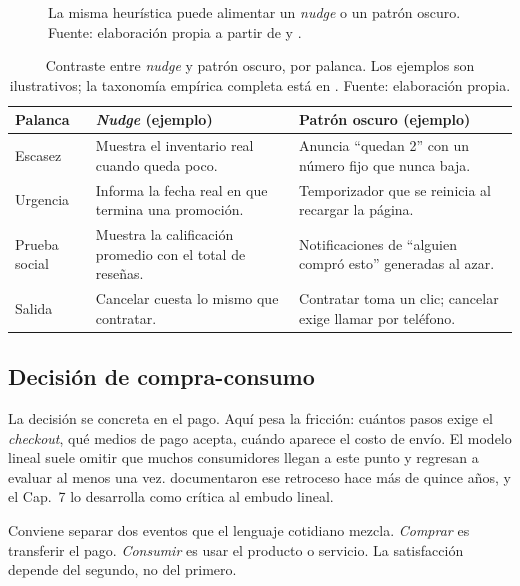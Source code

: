 \begin{figure}[!htb]
  \centering
  \resizebox{0.85\textwidth}{!}{}
  \caption{La misma heurística puede alimentar un \textit{nudge} o un patrón
  oscuro. Fuente: elaboración propia a partir de \textcite{thalersunstein2008}
  y \textcite{mathur2019}.}
  \label{fig:cap06-nudge}
\end{figure}

\begin{table}[!htb]
\centering
\begin{tabular}{@{}p{2.6cm}p{4.9cm}p{5.0cm}@{}}
\toprule
Palanca & \textit{Nudge} (ejemplo) & Patrón oscuro (ejemplo) \\
\midrule
Escasez & Muestra el inventario real cuando queda poco. & Anuncia \enquote{quedan 2} con un número fijo que nunca baja. \\
Urgencia & Informa la fecha real en que termina una promoción. & Temporizador que se reinicia al recargar la página. \\
Prueba social & Muestra la calificación promedio con el total de reseñas. & Notificaciones de \enquote{alguien compró esto} generadas al azar. \\
Salida & Cancelar cuesta lo mismo que contratar. & Contratar toma un clic; cancelar exige llamar por teléfono. \\
\bottomrule
\end{tabular}
\caption{Contraste entre \textit{nudge} y patrón oscuro, por palanca. Los
ejemplos son ilustrativos; la taxonomía empírica completa está en
\textcite{mathur2019}. Fuente: elaboración propia.}
\label{tab:cap06-nudge}
\end{table}

\subsection{Decisión de compra-consumo}

La decisión se concreta en el pago. Aquí pesa la fricción: cuántos pasos exige
el \textit{checkout}, qué medios de pago acepta, cuándo aparece el costo de
envío. El modelo lineal suele omitir que muchos consumidores llegan a este
punto y regresan a evaluar al menos una vez. \textcite{court2009consumer}
documentaron ese retroceso hace más de quince años, y el Cap.~7 lo desarrolla
como crítica al embudo lineal.

Conviene separar dos eventos que el lenguaje cotidiano mezcla. \emph{Comprar}
es transferir el pago. \emph{Consumir} es usar el producto o servicio. La
satisfacción depende del segundo, no del primero.

